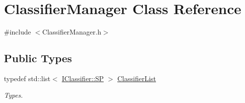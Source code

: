 \hypertarget{class_classifier_manager}{}\section{Classifier\+Manager Class Reference}
\label{class_classifier_manager}


{\ttfamily \#include $<$Classifier\+Manager.\+h$>$}

\subsection*{Public Types}
\begin{DoxyCompactItemize}
\item 
\mbox{\label{class_classifier_manager_aae20ce0b00515992da2c2375decebdd3}} 
typedef std\+::list$<$ \hyperlink{class_i_classifier_a532d21507aef94011669a0b73bd49c2d}{I\+Classifier\+::\+SP} $>$ \hyperlink{class_classifier_manager_aae20ce0b00515992da2c2375decebdd3}{Classifier\+List}
\begin{DoxyCompactList}\small\item\em Types. \end{DoxyCompactList}\end{DoxyCompactItemize}
